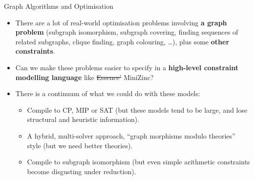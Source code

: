 \documentclass{beamer}
\begin{document}
\begin{frame}{Graph Algorithms and Optimisation}

    \begin{itemize}
        \item There are a lot of real-world optimisation problems involving \textbf{a
            graph problem} (subgraph isomorphism, subgraph covering, finding
            sequences of related subgraphs, clique finding, graph colouring,
            \ldots), plus some \textbf{other constraints}.

        \item Can we make these problems easier to specify in a
            \textbf{high-level constraint modelling language} like \sout{Essence'}
            MiniZinc?

        \item There is a continuum of what we could do with these models:

            \begin{itemize}

                \item Compile to CP, MIP or SAT (but these models tend to be large, and lose
                    structural and heuristic information).
                \item A hybrid, multi-solver approach, ``graph morphisms modulo theories'' style
                    (but we need better theories).
                \item Compile to subgraph isomorphism (but even simple arithmetic constraints become
                    disgusting under reduction).

            \end{itemize}
    \end{itemize}

\end{frame}
\end{document}
